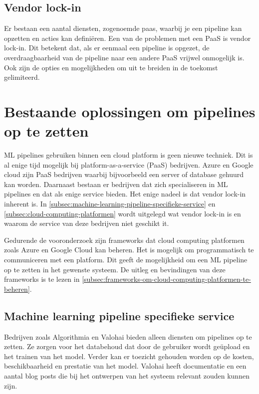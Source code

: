 \subsection{Vendor lock-in}\label{subsec:vendor-lock-in}
Er bestaan een aantal diensten, zogenoemde \acrfull{paas}, waarbij je een pipeline kan opzetten en acties kan definiëren. Een van de problemen met een PaaS is vendor lock-in. Dit betekent dat, als er eenmaal een pipeline is opgezet, de overdraagbaarheid van de pipeline naar een andere PaaS vrijwel onmogelijk is. Ook zijn de opties en mogelijkheden om uit te breiden in de toekomst gelimiteerd.

\section{Bestaande oplossingen om pipelines op te zetten}\label{sec:bestaande-oplossingen-om-pipelines-op-te-zetten}
ML pipelines gebruiken binnen een cloud platform is geen nieuwe techniek. Dit is al enige tijd mogelijk bij platform-as-a-service (PaaS) bedrijven. Azure en Google cloud zijn PaaS bedrijven waarbij bijvoorbeeld een server of database gehuurd kan worden. Daarnaast bestaan er bedrijven dat zich specialiseren in ML pipelines en dat als enige service bieden. Het enige nadeel is dat vendor lock-in inherent is. In \autoref{subsec:machine-learning-pipeline-specifieke-service} en \autoref{subsec:cloud-computing-platformen} wordt uitgelegd wat vendor lock-in is en waarom de service van deze bedrijven niet geschikt it.

Gedurende de vooronderzoek zijn frameworks dat cloud computing platformen zoals Azure en Google Cloud kan beheren. Het is mogelijk om programmatisch te communiceren met een platform. Dit geeft de mogelijkheid om een ML pipeline op te zetten in het gewenste systeem. De uitleg en bevindingen van deze frameworks is te lezen in \autoref{subsec:frameworks-om-cloud-computing-platformen-te-beheren}.

\subsection{Machine learning pipeline specifieke service}\label{subsec:machine-learning-pipeline-specifieke-service}
Bedrijven zoals Algorithmia \cite{algorithmia-website} en Valohai \cite{valohai-website} bieden alleen diensten om pipelines op te zetten. Ze zorgen voor het databehoud dat door de gebruiker wordt geüpload en het trainen van het model. Verder kan er toezicht gehouden worden op de kosten, beschikbaarheid en prestatie van het model. Valohai heeft documentatie en een aantal blog posts die bij het ontwerpen van het systeem relevant zouden kunnen zijn. 

